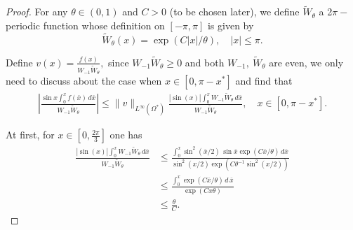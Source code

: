 \documentclass[10pt,a4paper]{amsart}
\begin{document}
 \begin{proof}
For any $\theta \in(0, 1)$ and  $C>0$ (to be chosen later),   we define  $\widetilde{W}_\theta$ a 2$\pi-$periodic function whose definition on  $[-\pi, \pi]$ is given  by
 \begin{equation}
 \widetilde{W}_\theta (x) =
 \exp(C|x|/{\theta}),\quad |x|\leq \pi. 
 \end{equation}
    

 Define $v(x)=\frac{f(x)}{W_{-1}\widetilde{W}_{\theta}},$ since $W_{-1} \widetilde{W}_\theta \geq 0$  and both $W_{-1},~\widetilde{W}_\theta$ are even, we only need to discuss about the case when $x\in[0, \pi-x^*]$  and find that 
   \begin{align*}
\left|\frac{\sin x \int_0^x f(\bar x)\,d\bar x}{W_{-1}\widetilde W_\theta}\right|  \leq \|v\|_{L^\infty(\Omega^*)} \frac{ |\sin (x)| \int_0^x W_{-1} \widetilde{W}_\theta \,d\bar x}{W_{-1} \widetilde{W}_\theta}, \quad x\in [0, \pi-x^*].
\end{align*}
 
  
  At first, for $x\in[0,  \frac{2\pi}{3}]$ one has 
 \begin{align*}
\frac{ |\sin (x)| \int_0^x W_{-1} \widetilde{W}_\theta \,d\bar x}{W_{-1} \widetilde{W}_\theta}&\leq  \frac{ \int_0^x \sin^2(\bar x/2)\,\sin \bar x \exp(C\bar x/\theta)  \,d\bar x}{ \sin^2({x/2})\exp(C\theta^{-1} \sin^2(x/2))}  \\
  &\leq  \frac{  \int_0^{x} \exp(C \bar x/\theta)  \,d \,\bar x}{ \exp(Cx\theta)}  \\
&\leq \frac{\theta}{C}.
 \end{align*}
   

\end{proof}
\end{document}
